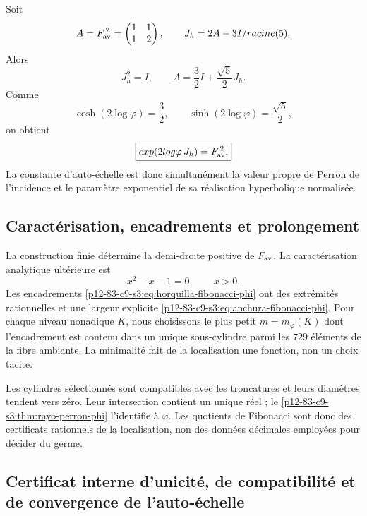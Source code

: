 Soit
\[
 A=F_{\rm av}^{\,2}=
 \begin{pmatrix}1&1\\1&2\end{pmatrix},
 \qquad
 J_h=\frac{2A-3I}{\sqrt5}.
\]
Alors
\[
 J_h^2=I,
 \qquad
 A=\frac32I+\frac{\sqrt5}{2}J_h.
\]
Comme
\[
 \cosh(2\log\varphi)=\frac32,
 \qquad
 \sinh(2\log\varphi)=\frac{\sqrt5}{2},
\]
on obtient
\begin{equation}
 \boxed{
 \exp(2\log\varphi\,J_h)=F_{\rm av}^{\,2}.}
 \label{p12-83-c9-s3:eq:realizacion-hiperbolica-phi}
\end{equation}
La constante d’auto-échelle est donc simultanément la valeur propre de
Perron de l’incidence et le paramètre exponentiel de sa réalisation
hyperbolique normalisée.

\subsection{Caractérisation, encadrements et prolongement}

La construction finie détermine la demi-droite positive de \(F_{\rm av}\). La
caractérisation analytique ultérieure est
\[
 x^2-x-1=0,
 \qquad x>0.
\]
Les encadrements \eqref{p12-83-c9-s3:eq:horquilla-fibonacci-phi} ont des extrémités rationnelles
et une largeur explicite \eqref{p12-83-c9-s3:eq:anchura-fibonacci-phi}. Pour chaque niveau
nonadique \(K\), nous choisissons le plus petit \(m=m_{\varphi}(K)\) dont l’encadrement est
contenu dans un unique sous-cylindre parmi les \(729\) éléments de la fibre
ambiante. La minimalité fait de la localisation une fonction, non un
choix tacite.

Les cylindres sélectionnés sont compatibles avec les troncatures et leurs
diamètres tendent vers zéro. Leur intersection contient un unique réel ; le
\cref{p12-83-c9-s3:thm:rayo-perron-phi} l’identifie à \(\varphi\). Les quotients de
Fibonacci sont donc des certificats rationnels de la localisation, non des données
décimales employées pour décider du germe.

\subsection{Certificat interne d'unicité, de compatibilité et de convergence de l'auto-échelle}

